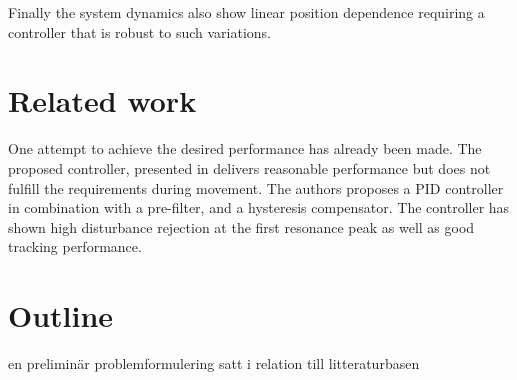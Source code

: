 Finally the system dynamics also show linear position dependence requiring a controller that is robust to such variations.

\section{Related work}
One attempt to achieve the desired performance has already been made. The proposed controller, presented in \citep{ButcherController:2015} delivers reasonable performance but does not fulfill the requirements during movement. The authors proposes a PID controller in combination with a pre-filter, and a hysteresis compensator. The controller has shown high disturbance rejection at the first resonance peak as well as good tracking performance.

\section{Outline}
en preliminär problemformulering satt i relation till litteraturbasen

